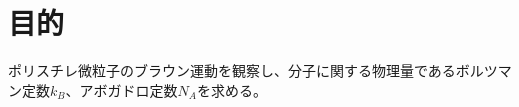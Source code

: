 \documentclass[../../../main]{subfiles}
\begin{document}
\section{目的}

ポリスチレ微粒子のブラウン運動を観察し、分子に関する物理量であるボルツマン定数$k_B$、アボガドロ定数$N_A$を求める。
\end{document}
